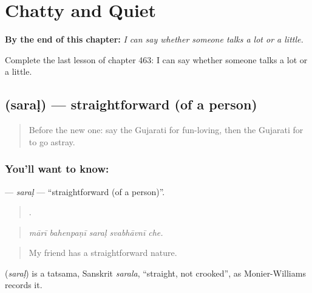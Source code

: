
\chapter{Chatty and Quiet}
\label{ch:gu-chatty-and-quiet}

\begin{chapteropening}
\textbf{By the end of this chapter:} \emph{I can say whether someone talks a lot or a little.}

Complete the last lesson of chapter 463: I can say whether someone talks a lot or a little.
\end{chapteropening}

\section[\texorpdfstring{\gu{સરળ} (saraḷ)}{સરળ (saraḷ)}]{ (saraḷ) — straightforward (of a person)}

\label{lesson:GU-C463-saral}



\begin{quote}
Before the new one: say the Gujarati for fun-loving, then the Gujarati for to go astray.
\end{quote}

\subsection*{You'll want to know: }
\textbf{} — \emph{saraḷ} — \textquotedblleft{}straightforward (of a person)\textquotedblright{}.

\begin{quote}
    .
\end{quote}

\begin{quote}
\emph{mārī bahenpaṇī saraḷ svabhāvnī che.}
\end{quote}

\begin{quote}
My friend has a straightforward nature.
\end{quote}

\begin{cousinweb}
\textbf{} (\emph{saraḷ}) is a tatsama, Sanskrit \emph{sarala}, \textquotedblleft{}straight, not crooked\textquotedblright{}, as Monier-Williams records it.
\end{cousinweb}

